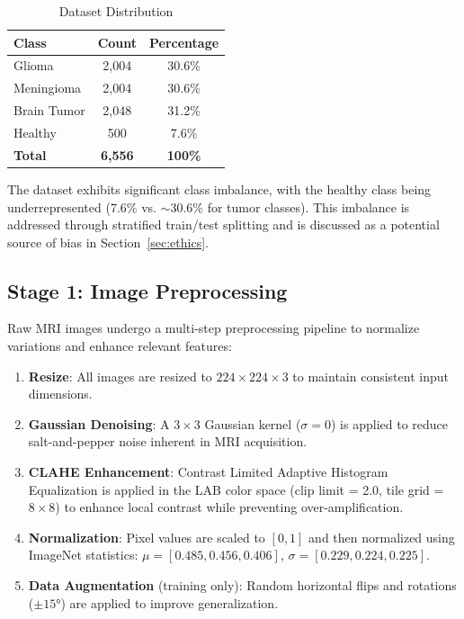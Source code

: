 \documentclass[conference]{IEEEtran}
\begin{document}
\begin{table}[h]
\centering
\caption{Dataset Distribution}
\label{tab:dataset}
\begin{tabular}{lcc}
\toprule
\textbf{Class} & \textbf{Count} & \textbf{Percentage} \\
\midrule
Glioma & 2,004 & 30.6\% \\
Meningioma & 2,004 & 30.6\% \\
Brain Tumor & 2,048 & 31.2\% \\
Healthy & 500 & 7.6\% \\
\midrule
\textbf{Total} & \textbf{6,556} & \textbf{100\%} \\
\bottomrule
\end{tabular}
\end{table}

The dataset exhibits significant class imbalance, with the healthy class being underrepresented (7.6\% vs. $\sim$30.6\% for tumor classes). This imbalance is addressed through stratified train/test splitting and is discussed as a potential source of bias in Section~\ref{sec:ethics}.

\subsection{Stage 1: Image Preprocessing}
\label{subsec:preprocessing}
Raw MRI images undergo a multi-step preprocessing pipeline to normalize variations and enhance relevant features:

\begin{enumerate}
    \item \textbf{Resize}: All images are resized to $224 \times 224 \times 3$ to maintain consistent input dimensions.
    \item \textbf{Gaussian Denoising}: A $3 \times 3$ Gaussian kernel ($\sigma = 0$) is applied to reduce salt-and-pepper noise inherent in MRI acquisition.
    \item \textbf{CLAHE Enhancement}: Contrast Limited Adaptive Histogram Equalization is applied in the LAB color space (clip limit = 2.0, tile grid = $8 \times 8$) to enhance local contrast while preventing over-amplification.
    \item \textbf{Normalization}: Pixel values are scaled to $[0, 1]$ and then normalized using ImageNet statistics: $\mu = [0.485, 0.456, 0.406]$, $\sigma = [0.229, 0.224, 0.225]$.
    \item \textbf{Data Augmentation} (training only): Random horizontal flips and rotations ($\pm 15°$) are applied to improve generalization.
\end{enumerate}
\end{document}
